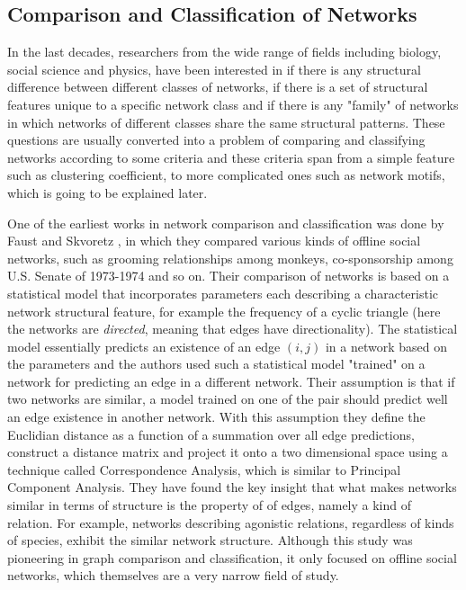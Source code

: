 \documentclass{article}
\begin{document}
	\subsection{Comparison and Classification of Networks}
	 In the last decades, researchers from the wide range of fields including biology, social science and physics, have been interested in if there is any structural difference between different classes of networks, if there is a set of structural features unique to a specific network class and if there is any "family" of networks in which networks of different classes share the same structural patterns. These questions are usually converted into a problem of comparing and classifying networks according to some criteria and these criteria span from a simple feature such as clustering coefficient, to more complicated ones such as network motifs, which is going to be explained later.
	
	One of the earliest works in network comparison and classification was done by Faust and Skvoretz \cite{Faust.Skvoretz2002Comparing}, in which they compared various kinds of offline social networks, such as grooming relationships among monkeys, co-sponsorship among U.S. Senate of 1973-1974 and so on. Their comparison of networks is based on a statistical model that incorporates parameters each describing a characteristic network structural feature, for example the frequency of a cyclic triangle (here the networks are \textit{directed}, meaning that edges have directionality). The statistical model essentially predicts an existence of an edge $(i,j)$ in a network based on the parameters and the authors used such a statistical model "trained" on a network for predicting an edge in a different network. Their assumption is that if two networks are similar, a model trained on one of the pair should predict well an edge existence in another network. With this assumption they define the Euclidian distance as a function of a summation over all edge predictions, construct a distance matrix and project it onto a two dimensional space using a technique called Correspondence Analysis, which is similar to Principal Component Analysis. They have found the key insight that what makes networks similar in terms of structure is the property of of edges, namely a kind of relation. For example, networks describing agonistic relations, regardless of kinds of species, exhibit the similar network structure. Although this study was pioneering in graph comparison and classification, it only focused on offline social networks, which themselves are a very narrow field of study.
	
\end{document}

